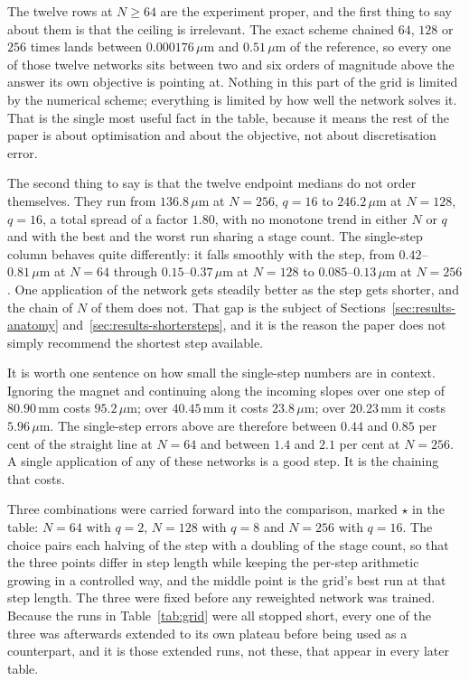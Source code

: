 \documentclass[11pt,a4paper]{article}
\newcommand{\um}{\ensuremath{\,\mu\mathrm{m}}}
\newcommand{\mm}{\ensuremath{\,\mathrm{mm}}}
\begin{document}
The twelve rows at $N \geq 64$ are the experiment proper, and the first thing
to say about them is that the ceiling is irrelevant. The exact scheme chained
$64$, $128$ or $256$ times lands between $0.000176\um$ and $0.51\um$ of the
reference, so every one of those twelve networks sits between two and six
orders of magnitude above the answer its own objective is pointing at. Nothing
in this part of the grid is limited by the numerical scheme; everything is
limited by how well the network solves it. That is the single most useful fact
in the table, because it means the rest of the paper is about optimisation and
about the objective, not about discretisation error.

The second thing to say is that the twelve endpoint medians do not order
themselves. They run from $136.8\um$ at $N = 256$, $q = 16$ to $246.2\um$ at
$N = 128$, $q = 16$, a total spread of a factor $1.80$, with no monotone trend
in either $N$ or $q$ and with the best and the worst run sharing a stage count.
The single-step column behaves quite differently: it falls smoothly with the
step, from $0.42$--$0.81\um$ at $N = 64$ through $0.15$--$0.37\um$ at $N = 128$
to $0.085$--$0.13\um$ at $N = 256$. One application of the network gets steadily
better as the step gets shorter, and the chain of $N$ of them does not. That
gap is the subject of Sections~\ref{sec:results-anatomy}
and~\ref{sec:results-shortersteps}, and it is the reason the paper does not
simply recommend the shortest step available.

It is worth one sentence on how small the single-step numbers are in context.
Ignoring the magnet and continuing along the incoming slopes over one step of
$80.90\mm$ costs $95.2\um$; over $40.45\mm$ it costs $23.8\um$; over
$20.23\mm$ it costs $5.96\um$. The single-step errors above are therefore
between $0.44$ and $0.85$ per cent of the straight line at $N = 64$ and
between $1.4$ and $2.1$ per cent at $N = 256$. A single application of any of
these networks is a good step. It is the chaining that costs.

Three combinations were carried forward into the comparison, marked $\star$ in
the table: $N = 64$ with $q = 2$, $N = 128$ with $q = 8$ and $N = 256$ with
$q = 16$. The choice pairs each halving of the step with a doubling of the
stage count, so that the three points differ in step length while keeping the
per-step arithmetic growing in a controlled way, and the middle point is the
grid's best run at that step length. The three were fixed before any
reweighted network was trained. Because the runs in Table~\ref{tab:grid} were
all stopped short, every one of the three was afterwards extended to its own
plateau before being used as a counterpart, and it is those extended runs, not
these, that appear in every later table.
\end{document}
